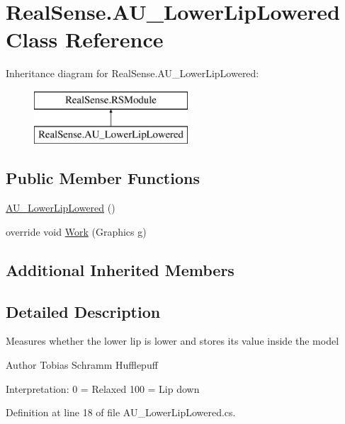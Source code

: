 \hypertarget{class_real_sense_1_1_a_u___lower_lip_lowered}{}\section{Real\+Sense.\+A\+U\+\_\+\+Lower\+Lip\+Lowered Class Reference}
\label{class_real_sense_1_1_a_u___lower_lip_lowered}
Inheritance diagram for Real\+Sense.\+A\+U\+\_\+\+Lower\+Lip\+Lowered\+:\begin{figure}[H]
\begin{center}
\leavevmode
\includegraphics[height=2.000000cm]{class_real_sense_1_1_a_u___lower_lip_lowered}
\end{center}
\end{figure}
\subsection*{Public Member Functions}
\begin{DoxyCompactItemize}
\item 
\hyperlink{class_real_sense_1_1_a_u___lower_lip_lowered_a510ce477e2525d7859299aaf92c3c88b}{A\+U\+\_\+\+Lower\+Lip\+Lowered} ()
\item 
override void \hyperlink{class_real_sense_1_1_a_u___lower_lip_lowered_ad94e215984e23238a6231d6a9723a522}{Work} (Graphics g)
\end{DoxyCompactItemize}
\subsection*{Additional Inherited Members}


\subsection{Detailed Description}
Measures whether the lower lip is lower and stores its\textquotesingle{} value inside the model \begin{DoxyAuthor}{Author}
Tobias Schramm  Hufflepuff
\end{DoxyAuthor}
Interpretation\+: 0 = Relaxed 100 = Lip down 

Definition at line 18 of file A\+U\+\_\+\+Lower\+Lip\+Lowered.\+cs.



